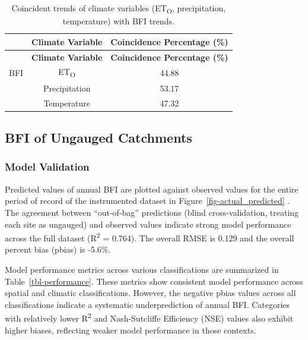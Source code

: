 \documentclass[
  authoryear,
  preprint,
  1p,
  onecolumn]{elsarticle}
\begin{document}
\begin{longtable}[]{@{}lcc@{}}
\caption{Coincident trends of climate variables (ET\textsubscript{O},
precipitation, temperature) with BFI
trends.}\label{tbl-coincident-trends}\tabularnewline
\toprule\noalign{}
& \textbf{Climate Variable} & \textbf{Coincidence Percentage (\%)} \\
\midrule\noalign{}
\endfirsthead
\toprule\noalign{}
& \textbf{Climate Variable} & \textbf{Coincidence Percentage (\%)} \\
\midrule\noalign{}
\endhead
\bottomrule\noalign{}
\endlastfoot
BFI & ET\textsubscript{O} & 44.88 \\
& Precipitation & 53.17 \\
& Temperature & 47.32 \\
\end{longtable}

\subsection{BFI of Ungauged
Catchments}\label{bfi-of-ungauged-catchments}

\subsubsection{Model Validation}\label{model-validation}

Predicted values of annual BFI are plotted against observed values for
the entire period of record of the instrumented dataset in
Figure~\ref{fig-actual_predicted} . The agreement between ``out-of-bag''
predictions (blind cross-validation, treating each site as ungauged) and
observed values indicate strong model performance across the full
dataset (R\textsuperscript{2} = 0.764). The overall RMSE is 0.129 and
the overall percent bias (pbias) is -5.6\%.

Model performance metrics across various classifications are summarized
in Table~\ref{tbl-performance}. These metrics show consistent model
performance across spatial and climatic classifications. However, the
negative pbias values across all classifications indicate a systematic
underprediction of annual BFI. Categories with relatively lower
R\textsuperscript{2} and Nash-Sutcliffe Efficiency (NSE) values also
exhibit higher biases, reflecting weaker model performance in those
contexts.
\end{document}
